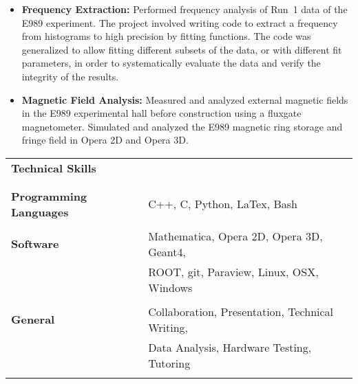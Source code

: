 \begin{center}
\begin{itemize}
	\item{{\bf Frequency Extraction:} Performed frequency analysis of Run~1 data of the E989 experiment. The project involved writing code to extract a frequency from histograms to high precision by fitting functions. The code was generalized to allow fitting different subsets of the data, or with different fit parameters, in order to systematically evaluate the data and verify the integrity of the results.}
	
	\item{{\bf Magnetic Field Analysis:} Measured and analyzed external magnetic fields in the E989 experimental hall before construction using a fluxgate magnetometer. Simulated and analyzed the E989 magnetic ring storage and fringe field in Opera 2D and Opera 3D.}
\end{itemize}


\vspace{0.2in}
\begin{tabular*}{\linewidth}{@{\extracolsep{\fill}}ll}
  \multicolumn{2}{l}{\textbf{{\Large Technical Skills}}} \\
\\
\hline
\\

  {\bf Programming Languages} & C++, C, Python, LaTex, Bash \\
  							  & \\
  {\bf Software} 		      & Mathematica, Opera 2D, Opera 3D, Geant4,  \\
  							  & ROOT, git, Paraview, Linux, OSX, Windows \\
  							  & \\
  {\bf General} 		      & Collaboration, Presentation, Technical Writing, \\
  							  & Data Analysis, Hardware Testing, Tutoring \\ 
  							  & \\ 					
\end{tabular*}




\end{center}

